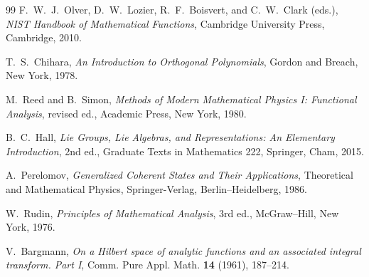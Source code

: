 \documentclass[11pt]{article}
\numberwithin{equation}{section}
\theoremstyle{definition}
\begin{document}
\begin{thebibliography}{99}
F.~W.~J.~Olver, D.~W.~Lozier, R.~F.~Boisvert, and C.~W.~Clark (eds.),
\emph{NIST Handbook of Mathematical Functions},
Cambridge University Press, Cambridge, 2010.

T.~S.~Chihara,
\emph{An Introduction to Orthogonal Polynomials},
Gordon and Breach, New York, 1978.

M.~Reed and B.~Simon,
\emph{Methods of Modern Mathematical Physics I: Functional Analysis},
revised ed., Academic Press, New York, 1980.

B.~C.~Hall,
\emph{Lie Groups, Lie Algebras, and Representations: An Elementary Introduction},
2nd ed., Graduate Texts in Mathematics 222, Springer, Cham, 2015.

A.~Perelomov,
\emph{Generalized Coherent States and Their Applications},
Theoretical and Mathematical Physics, Springer-Verlag, Berlin--Heidelberg, 1986.

W.~Rudin,
\emph{Principles of Mathematical Analysis},
3rd ed., McGraw--Hill, New York, 1976.

V.~Bargmann,
\emph{On a Hilbert space of analytic functions and an associated integral
transform. Part I},
Comm. Pure Appl. Math. \textbf{14} (1961), 187--214.

\end{thebibliography}
\end{document}

